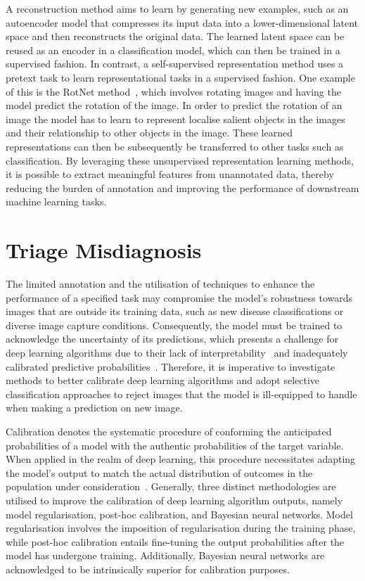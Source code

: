 A reconstruction method aims to learn by generating new examples, such as an autoencoder model that compresses its input data into a lower-dimensional latent space and then reconstructs the original data. The learned latent space can be reused as an encoder in a classification model, which can then be trained in a supervised fashion. In contrast, a self-supervised representation method uses a pretext task to learn representational tasks in a supervised fashion. One example of this is the RotNet method~\citep{gidaris2018unsupervised}, which involves rotating images and having the model predict the rotation of the image. In order to predict the rotation of an image the model has to learn to represent localise salient objects in the images and their relationship to other objects in the image. These learned representations can then be subsequently be transferred to other tasks such as classification. By leveraging these unsupervised representation learning methods, it is possible to extract meaningful features from unannotated data, thereby reducing the burden of annotation and improving the performance of downstream machine learning tasks.

\section{Triage Misdiagnosis}
The limited annotation and the utilisation of techniques to enhance the performance of a specified task may compromise the model's robustness towards images that are outside its training data, such as new disease classifications or diverse image capture conditions. Consequently, the model must be trained to acknowledge the uncertainty of its predictions, which presents a challenge for deep learning algorithms due to their lack of interpretability~\citep{zhang2018visual} and inadequately calibrated predictive probabilities~\citep{gal2016dropout}. Therefore, it is imperative to investigate methods to better calibrate deep learning algorithms and adopt selective classification approaches to reject images that the model is ill-equipped to handle when making a prediction on new image.

Calibration denotes the systematic procedure of conforming the anticipated probabilities of a model with the authentic probabilities of the target variable. When applied in the realm of deep learning, this procedure necessitates adapting the model's output to match the actual distribution of outcomes in the population under consideration~\citep{guo2017calibration}. Generally, three distinct methodologies are utilised to improve the calibration of deep learning algorithm outputs, namely model regularisation, post-hoc calibration, and Bayesian neural networks. Model regularisation involves the imposition of regularisation during the training phase, while post-hoc calibration entails fine-tuning the output probabilities after the model has undergone training. Additionally, Bayesian neural networks are acknowledged to be intrinsically superior for calibration purposes.

